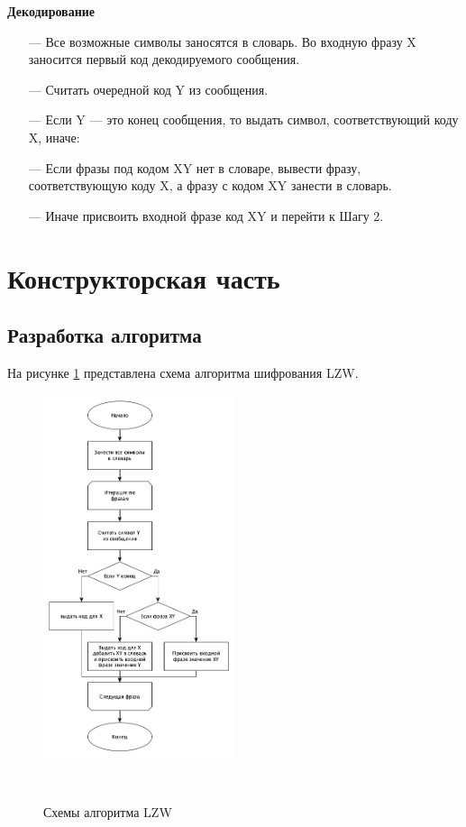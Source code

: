 \textbf{Декодирование}

\begin{enumerate}
  \item[---] Все возможные символы заносятся в словарь. Во входную фразу X
  заносится первый код декодируемого сообщения.
  \item[---] Считать очередной код Y из сообщения.
  \item[---] Если Y --- это конец сообщения, то выдать символ, соответствующий коду X, иначе:
  \item[---] Если фразы под кодом XY нет в словаре, вывести фразу, соответствующую коду X, а фразу с кодом XY занести в словарь.
  \item[---] Иначе присвоить входной фразе код XY и перейти к Шагу 2.
\end{enumerate}

\clearpage

\section{Конструкторская часть}

\subsection{Разработка алгоритма}

На рисунке \ref{fig:algo} представлена схема алгоритма шифрования LZW.

%

\begin{figure}[h!]
	\centering
	\includegraphics[width=0.5\textwidth]{assets/graphs/lzf.png}
	\caption{Схемы алгоритма LZW}
  \
	\label{fig:algo}
\end{figure}
\clearpage

